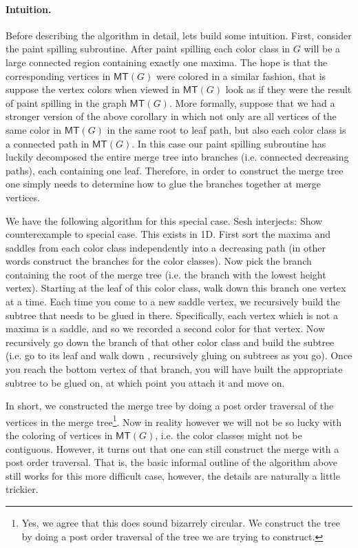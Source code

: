 \documentclass[A4paper,11pt]{article}
\newcommand{\Reminder}[1]{{\color{red}#1}}
\newcommand{\Sesh}[1]{\Reminder{Sesh interjects: #1}}
\newcommand{\MT}{\ensuremath{\mathsf{MT}}\xspace}
\begin{document}
\paragraph{Intuition.}  Before describing the algorithm in detail, lets build some intuition.  First, consider the paint spilling subroutine.  After paint spilling each color class in $G$ will be a large connected region containing exactly one maxima.  The hope is that the corresponding vertices in $\MT(G)$ were colored in a similar fashion, that is suppose the vertex colors when viewed in $\MT(G)$ look as if they were the result of paint spilling in the graph $\MT(G)$.  More formally, suppose that we had a stronger version of the above corollary in which not only are all vertices of the same color in $\MT(G)$ in the same root to leaf path, but also each color class is a connected path in $\MT(G)$.  In this case our paint spilling subroutine has luckily decomposed the entire merge tree into branches (i.e. connected decreasing paths), each containing one leaf.  Therefore, in order to construct the merge tree one simply needs to determine how to glue the branches together at merge vertices.  

We have the following algorithm for this special case. \Sesh{Show counterexample to special case. This exists in 1D.} 
First sort the maxima and saddles from each color class independently into a decreasing path (in other words construct the branches for the color classes).  Now pick the branch containing the root of the merge tree (i.e. the branch with the lowest height vertex).  Starting at the leaf of this color class, walk down this branch one vertex at a time.  Each time you come to a new saddle vertex, we recursively build the subtree that needs to be glued in there.  Specifically, each vertex which is not a maxima is a saddle, and so we recorded a second color for that vertex.  Now recursively go down the branch of that other color class and build the subtree (i.e. go to its leaf and walk down , recursively gluing on subtrees as you go).  Once you reach the bottom vertex of that branch, you will have built the appropriate subtree to be glued on, at which point you attach it and move on.

In short, we constructed the merge tree by doing a post order traversal of the vertices in the merge tree\footnote{Yes, we agree that this does sound bizarrely circular.  We construct the tree by doing a post order traversal of the tree we are trying to construct.}.  Now in reality however we will not be so lucky with the coloring of vertices in $\MT(G)$, i.e. the color classes might not be contiguous.  However, it turns out that one can still construct the merge with a post order traversal.  That is, the basic informal outline of the algorithm above still works for this more difficult case, however, the details are naturally a little trickier.
\end{document}
